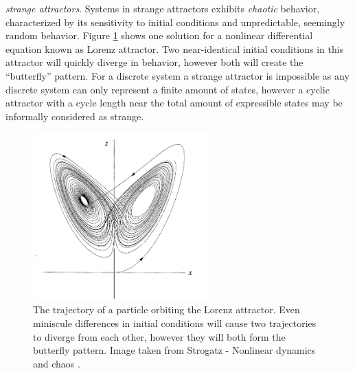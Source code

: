 \emph{strange attractors}.
Systems in strange attractors exhibits \emph{chaotic} behavior, characterized by
its sensitivity to initial conditions and unpredictable, seemingly random
behavior.
Figure \ref{figStrange} shows one solution for a nonlinear differential equation known
as Lorenz attractor.
Two near-identical initial conditions in this attractor will quickly diverge in
behavior, however both will create the ``butterfly'' pattern.
For a discrete system a strange attractor is impossible as any discrete system
can only represent a finite amount of states, however a cyclic attractor with a
cycle length near the total amount of expressible states may be informally
considered as strange.
\begin{figure}[h!]
  \centering
  \includegraphics[width=0.6\textwidth]{fig/strange.png}
  \caption[The Lorenz attractor]{
    The trajectory of a particle orbiting the Lorenz attractor.
    Even miniscule differences in initial conditions will cause two trajectories
    to diverge from each other, however they will both form the butterfly
    pattern.
    Image taken from Strogatz - Nonlinear dynamics and chaos \cite{strogatz2014}.
  }
  \label{figStrange}
\end{figure}
%
